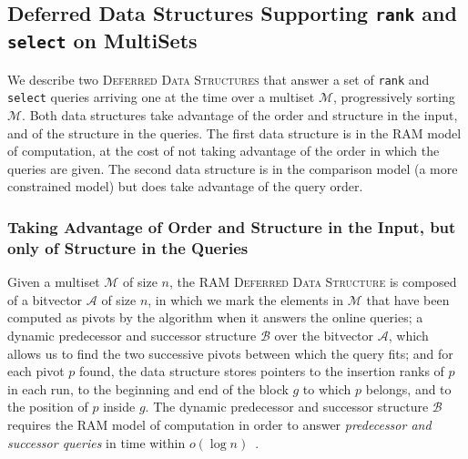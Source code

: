 \subsection{Deferred Data Structures Supporting \texttt{rank} and
  \texttt{select} on MultiSets}
\label{sec:dds}

We describe two \textsc{Deferred Data Structures} that answer a set of \texttt{rank} and \texttt{select} queries arriving one at the time over a multiset $\mathcal{M}$, progressively sorting $\mathcal{M}$.  
%
Both data structures take advantage of the order and structure in the input, and of the structure in the queries.
%
The first data structure is in the RAM model of computation, at the cost of not taking advantage of the order in which the queries are given. The second data structure is in the comparison model (a more constrained model) but does take advantage of the query order.

\subsubsection{Taking Advantage of  Order and Structure in the Input, but only of Structure in the Queries}

Given a multiset $\mathcal{M}$ of size $n$, the \textsc{RAM Deferred
  Data Structure} is composed of a bitvector $\mathcal{A}$ of size
$n$, in which we mark the elements in $\mathcal{M}$ that have been
computed as pivots by the algorithm when it answers the online
queries; a dynamic predecessor and successor structure $\mathcal{B}$
over the bitvector $\mathcal{A}$, which allows us to find the two
successive pivots between which the query fits; and for each pivot $p$
found, the data structure stores pointers to the insertion ranks of
$p$ in each run, to the beginning and end of the block $g$ to which
$p$ belongs, and to the position of $p$ inside $g$. The dynamic
predecessor and successor structure $\mathcal{B}$ requires the RAM
model of computation in order to answer \emph{predecessor and
  successor queries} in time within
$o(\log{n})$~\cite{2002-JCSS-OptimalBoundsForThePredecessorProblemAndRelatedProblems-BeameFich}.

